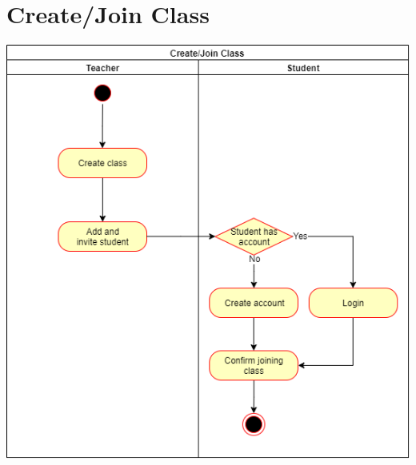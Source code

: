 \documentclass[12pt]{article}
\begin{document}

\begin{titlepage}
    \maketitle
    \thispagestyle{firstpage}
\end{titlepage}

\pagebreak
\tableofcontents\label{toc}
\pagebreak

\pagestyle{specs}

\section{Create/Join Class}
    \begin{center}\includegraphics[width=\textwidth]{images/CreateJoinClass.png}\end{center}
\end{document}
